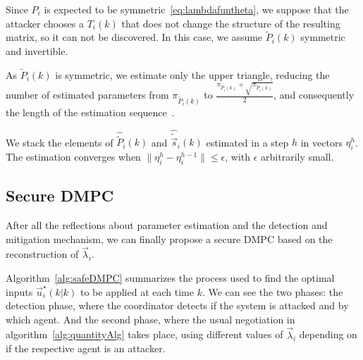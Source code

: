 \documentclass[a4paper, 10 pt, conference]{ieeeconf}  %
\begin{document}
\begin{assumption}\label{ass:tildePinvertible}
Since $P_{i}$ is expected to be symmetric~\eqref{eq:lambdafuntheta}, we suppose that the attacker chooses a $T_{i}(k)$ that does not change the structure of the resulting matrix, so it can not be discovered.
In this case, we assume $\tilde{P}_{i}(k)$ symmetric and invertible.
\end{assumption}
As $\tilde{P}_{i}(k)$ is symmetric, we estimate only the upper triangle, reducing the number of estimated parameters from $\pi_{\tilde{P}_{i}(k)}$ to $\frac{\pi_{\tilde{P}_{i}(k)}+\sqrt{\pi_{\tilde{P}_{i}(k)}}}{2}$, and consequently the length of the estimation sequence~\cite{AastroemWittenmark1989}.

We stack the elements of $\widehat{\tilde{P}}_{i}(k)$ and $\widehat{\tilde{\vec{s}}}_{i}(k)$ estimated in a step $h$ in vectors $\eta_{i}^{h}$. The estimation converges when
${\|\eta_{i}^{h}-\eta_{i}^{h-1}\|\leq\epsilon}$,
with $\epsilon$ arbitrarily small.


\subsection{Secure DMPC}
\label{sec:secure-dmpc}
After all the reflections about parameter estimation and the detection and mitigation mechanism, we can finally propose a secure DMPC based on the reconstruction of $\vec{\lambda}_{i}$.

Algorithm~\ref{alg:safeDMPC} summarizes the process used to find the optimal inputs $\vec{u}_{i}^{\star}(k|k)$ to be applied at each time $k$.
We can see the two phases: the detection phase, where the coordinator detects if the system is attacked and by which agent. And the second phase, where the usual negotiation in algorithm~\ref{alg:quantityAlg} takes place, using different values of $\vec{\lambda}_{i}$ depending on if the respective agent is an attacker.
\end{document}
